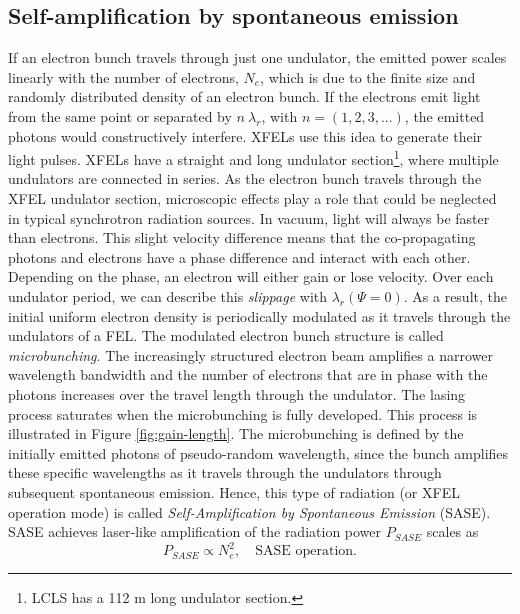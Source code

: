 \subsection{Self-amplification by spontaneous emission}\label{sec:sase}
If an electron bunch travels through just one undulator, the emitted power scales linearly with the number of electrons, $N_{e}$, which is due to the finite size and randomly distributed density of an electron bunch. If the electrons emit light from the same point or separated by $n\ \lambda_{r}$, with $n=\left(1, 2, 3, ...\right)$, the emitted photons would constructively interfere. XFELs use this idea to generate their light pulses. XFELs have a straight and long undulator section\footnote{LCLS has a 112 m long undulator section.}, where multiple undulators are connected in series. As the electron bunch travels through the XFEL undulator section, microscopic effects play a role that could be neglected in typical synchrotron radiation sources. In vacuum, light will always be faster than electrons. This slight velocity difference means that the co-propagating photons and electrons have a phase difference and interact with each other. Depending on the phase, an electron will either gain or lose velocity. Over each undulator period, we can describe this \textit{slippage} with $\lambda_{r}(\Psi = 0)$. As a result, the initial uniform electron density is periodically modulated as it travels through the undulators of a FEL. The modulated electron bunch structure is called \textit{microbunching}. The increasingly structured electron beam amplifies a narrower wavelength bandwidth and the number of electrons that are in phase with the photons increases over the travel length through the undulator. The lasing process saturates when the microbunching is fully developed. This process is illustrated in Figure \ref{fig:gain-length}.
The microbunching is defined by the initially emitted photons of pseudo-random wavelength, since the bunch amplifies these specific wavelengths as it travels through the undulators through subsequent spontaneous emission.
Hence, this type of radiation (or XFEL operation mode) is called \textit{Self-Amplification by Spontaneous Emission} (SASE). SASE achieves laser-like amplification of the radiation power $P_{SASE}$ scales as \citep[see][p.~61]{Als-Nielson-2011-JWS}
\begin{equation}
P_{SASE} \propto N_{e}^{2},\quad \text{SASE operation.}
\end{equation}
